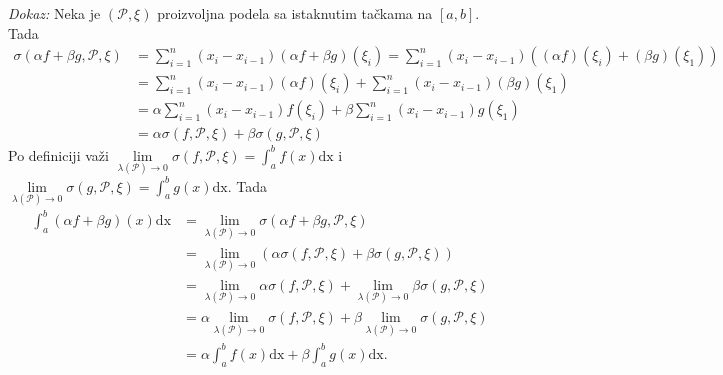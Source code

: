 \documentclass{article}
\begin{document}
\textit{Dokaz:} Neka je $\left(\mathcal{P}, \xi\right)$ proizvoljna podela sa istaknutim tačkama na $\left[a, b\right]$. Tada
\begin{align*}
    \sigma\left(\alpha f+\beta g, \mathcal{P}, \xi\right) & = \sum^n_{i=1} \left(x_i - x_{i-1}\right)\left(\alpha f+\beta g\right)\left(\xi_i\right)                           = \sum^n_{i=1} \left(x_i - x_{i-1}\right)\left(\left(\alpha f\right)\left(\xi_i\right) + \left(\beta g\right)\left(\xi_1\right)\right) \\
                                                          & = \sum^n_{i=1} \left(x_i - x_{i-1}\right)\left(\alpha f\right)\left(\xi_i\right) + \sum^n_{i=1} \left(x_i - x_{i-1}\right)\left(\beta g\right)\left(\xi_1\right)                                                                                          \\
                                                          & = \alpha\sum^n_{i=1} \left(x_i - x_{i-1}\right) f\left(\xi_i\right) + \beta\sum^n_{i=1} \left(x_i - x_{i-1}\right)g\left(\xi_1\right)                                                                                                                     \\
                                                          & = \alpha\sigma\left(f, \mathcal{P}, \xi\right) + \beta\sigma\left(g, \mathcal{P}, \xi\right)
\end{align*}
Po definiciji važi $\displaystyle\lim\limits_{\lambda\left(\mathcal{P}\right)\longrightarrow0} \sigma\left(f, \mathcal{P}, \xi\right) = \int^b_a f\left(x\right)\text{dx}$ i $\displaystyle \lim\limits_{\lambda\left(\mathcal{P}\right)\longrightarrow0} \sigma\left(g, \mathcal{P}, \xi\right) = \int^b_a g\left(x\right)\text{dx}$. Tada
\begin{align*}
    \int_{a}^{b}\left(\alpha f+\beta g\right)\left(x\right)\text{dx} & =\lim\limits_{\lambda\left(\mathcal{P}\right)\longrightarrow0} \sigma\left(\alpha f+\beta g, \mathcal{P}, \xi\right)                                                                                                  \\
                                                                     & =\lim\limits_{\lambda\left(\mathcal{P}\right)\longrightarrow0}\left(\alpha\sigma\left(f, \mathcal{P}, \xi\right) + \beta\sigma\left(g, \mathcal{P}, \xi\right)\right)                                                 \\
                                                                     & =\lim\limits_{\lambda\left(\mathcal{P}\right)\longrightarrow0}\alpha\sigma\left(f, \mathcal{P}, \xi\right) + \lim\limits_{\lambda\left(\mathcal{P}\right)\longrightarrow0}\beta\sigma\left(g, \mathcal{P}, \xi\right) \\
                                                                     & =\alpha\lim\limits_{\lambda\left(\mathcal{P}\right)\longrightarrow0}\sigma\left(f, \mathcal{P}, \xi\right) + \beta\lim\limits_{\lambda\left(\mathcal{P}\right)\longrightarrow0}\sigma\left(g, \mathcal{P}, \xi\right) \\
                                                                     & =\alpha \int^b_a f\left(x\right)\text{dx} +\beta\int^b_a g\left(x\right)\text{dx}.
\end{align*}
\end{document}
